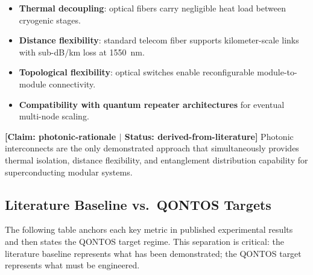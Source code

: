 \documentclass[conference]{IEEEtran}
\begin{document}
\begin{itemize}
\item \textbf{Thermal decoupling}: optical fibers carry negligible heat load between cryogenic stages.
\item \textbf{Distance flexibility}: standard telecom fiber supports kilometer-scale links with sub-dB/km loss at 1550~nm.
\item \textbf{Topological flexibility}: optical switches enable reconfigurable module-to-module connectivity.
\item \textbf{Compatibility with quantum repeater architectures} for eventual multi-node scaling.
\end{itemize}

\textbf{[Claim: photonic-rationale $|$ Status: derived-from-literature]} Photonic interconnects are the only demonstrated approach that simultaneously provides thermal isolation, distance flexibility, and entanglement distribution capability for superconducting modular systems.

\subsection{Literature Baseline vs.\ QONTOS Targets}

The following table anchors each key metric in published experimental results and then states the QONTOS target regime. This separation is critical: the literature baseline represents what has been demonstrated; the QONTOS target represents what must be engineered.
\end{document}

